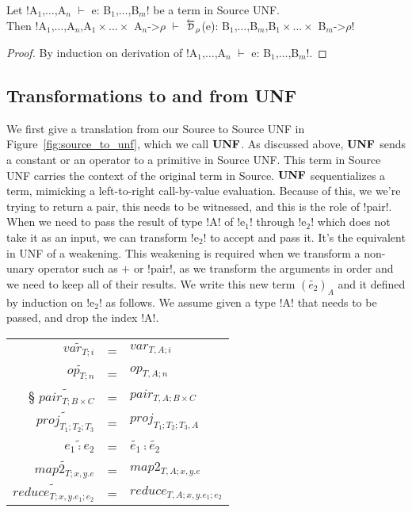 \begin{lemma}
    Let !A$_{1}$,$\ldots$,A$_{n}$ $\vdash$ e: B$_{1}$,$\ldots$,B$_{m}$! be a term in Source UNF. \\
    Then 
        !A$_{1}$,$\ldots$,A$_{n}$,A$_{1}\times\ldots\times$ A$_{n}$->$\rho$ $\vdash$ $\Dsynrevsymbol_{\rho}$(e): B$_{1}$,$\ldots$,B$_{m}$,B$_{1}\times\ldots\times$ B$_{m}$->$\rho$!
\end{lemma}
\begin{proof}
    By induction on derivation of !A$_{1}$,$\ldots$,A$_{n}$ $\vdash$ e: B$_{1}$,$\ldots$,B$_{m}$!.
\end{proof}



\subsection{Transformations to and from UNF} %
\label{sub:transformations to and from UNF}

We first give a translation from our Source to Source UNF in Figure~\ref{fig:source_to_unf}, which we call $\mathbf{UNF}$.
As discussed above, $\mathbf{UNF}$ sends a constant or an operator to a primitive in Source UNF. 
This term in Source UNF carries the context of the original term in Source.
$\mathbf{UNF}$ sequentializes a term, mimicking a left-to-right call-by-value evaluation.
Because of this, we we're trying to return a pair, this needs to be witnessed, and this is the role of !pair!.
When we need to pass the result of type !A! of !e$_{1}$! through !e$_{2}$! which does not take it as an input, we can transform !e$_{2}$! to accept and pass it.
It's the equivalent in UNF of a weakening.
This weakening is required when we transform a non-unary operator such as $+$ or !pair!, as we transform the arguments in order and we need to keep all of their results.
We write this new term $(\widetilde{e_{2}})_{A}$ and it defined by induction on !e$_{2}$! as follows. 
We assume given a type !A! that needs to be passed, and drop the index !A!.

\begin{tabular}{r c l}
    $\widetilde{var_{T;i}}$  &=& $var_{T,A;i}$ \\
    $\widetilde{op_{T;n}}$  &=& $op_{T,A;n}$ \\§
    $\widetilde{pair_{T;B\times C}}$  &=& $pair_{T,A;B\times C}$ \\
    $\widetilde{proj_{T_1;T_2;T_3}}$  &=& $proj_{T_1;T_2;T_3,A}$ \\
    $\widetilde{e_1 \comp e_2}$  &=& $\widetilde{e_1}\comp\widetilde{e_2}$ \\
    $\widetilde{map2_{T;x,y.e}}$  &=& $map2_{T,A;x,y.e}$ \\
    $\widetilde{reduce_{T;x,y.e_1;e_2}}$ &=& $reduce_{T,A;x,y.e_1;e_2}$ \\
\end{tabular}

